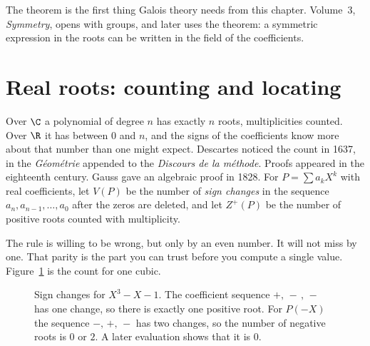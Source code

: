 The theorem is the first thing Galois theory needs from this chapter. Volume~3, \emph{Symmetry}, opens with groups, and later uses the theorem: a symmetric expression in the roots can be written in the field of the coefficients.

\section{Real roots: counting and locating}

Over $\C$ a polynomial of degree $n$ has exactly $n$ roots, multiplicities counted. Over $\R$ it has between $0$ and $n$, and the signs of the coefficients know more about that number than one might expect. Descartes noticed the count in 1637, in the \emph{G\'eom\'etrie} appended to the \emph{Discours de la m\'ethode}. Proofs appeared in the eighteenth century. Gauss gave an algebraic proof in 1828. For $P=\sum a_kX^k$ with real coefficients, let $V(P)$ be the number of \emph{sign changes} in the sequence $a_n,a_{n-1},\dots,a_0$ after the zeros are deleted, and let $Z^+(P)$ be the number of positive roots counted with multiplicity.

The rule is willing to be wrong, but only by an even number. It will not miss by one. That parity is the part you can trust before you compute a single value. Figure~\ref{fig:signs} is the count for one cubic.

\begin{figure}[ht]
\centering
{}
\caption{Sign changes for $X^3-X-1$. The coefficient sequence $+,\,-\,,\,-$ has one change, so there is exactly one positive root. For $P(-X)$ the sequence $-,\,+,\,-$ has two changes, so the number of negative roots is $0$ or $2$. A later evaluation shows that it is $0$.}
\label{fig:signs}
\end{figure}

